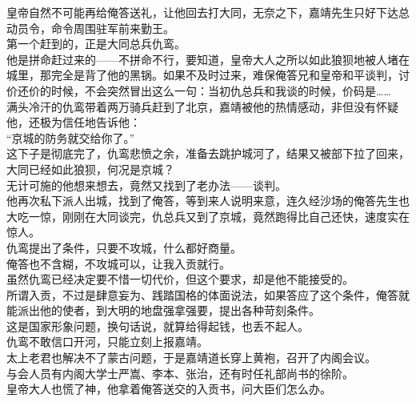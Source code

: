 \begin{multicols}{\theparacolNo}
皇帝自然不可能再给俺答送礼，让他回去打大同，无奈之下，嘉靖先生只好下达总动员令，命令周围驻军前来勤王。\\

第一个赶到的，正是大同总兵仇鸾。\\

他是拼命赶过来的——不拼命不行，要知道，皇帝大人之所以如此狼狈地被人堵在城里，那完全是背了他的黑锅。如果不及时过来，难保俺答兄和皇帝和平谈判，讨价还价的时候，不会突然冒出这么一句：当初仇总兵和我谈的时候，价码是……\\

满头冷汗的仇鸾带着两万骑兵赶到了北京，嘉靖被他的热情感动，非但没有怀疑他，还极为信任地告诉他：\\

“京城的防务就交给你了。”\\

这下子是彻底完了，仇鸾悲愤之余，准备去跳护城河了，结果又被部下拉了回来，大同已经如此狼狈，何况是京城？\\

无计可施的他想来想去，竟然又找到了老办法——谈判。\\

他再次私下派人出城，找到了俺答，等到来人说明来意，连久经沙场的俺答先生也大吃一惊，刚刚在大同谈完，仇总兵又到了京城，竟然跑得比自己还快，速度实在惊人。\\

仇鸾提出了条件，只要不攻城，什么都好商量。\\

俺答也不含糊，不攻城可以，让我入贡就行。\\

虽然仇鸾已经决定要不惜一切代价，但这个要求，却是他不能接受的。\\

所谓入贡，不过是肆意妄为、践踏国格的体面说法，如果答应了这个条件，俺答就能派出他的使者，到大明的地盘强拿强要，提出各种苛刻条件。\\

这是国家形象问题，换句话说，就算给得起钱，也丢不起人。\\

仇鸾不敢信口开河，只能立刻上报嘉靖。\\

太上老君也解决不了蒙古问题，于是嘉靖道长穿上黄袍，召开了内阁会议。\\

与会人员有内阁大学士严嵩、李本、张治，还有时任礼部尚书的徐阶。\\

皇帝大人也慌了神，他拿着俺答送交的入贡书，问大臣们怎么办。\\


\end{multicols}
